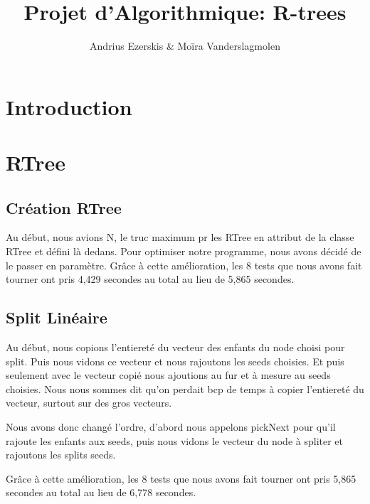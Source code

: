 \documentclass[utf8]{article}
\begin{document}
\begin{titlepage}


\author{Andrius Ezerskis \& Moïra Vanderslagmolen}
\title{Projet d'Algorithmique: R-trees}

\maketitle
\end{titlepage}
\tableofcontents
\newpage
\begin{large}



\section{Introduction}
\indent
\par


\par
\section{RTree}
\subsection{Création RTree}
\par
\indent
Au début, nous avions N, le truc maximum pr les RTree en attribut de la classe RTree et défini là dedans.
Pour optimiser notre programme, nous avons décidé de le passer en paramètre.
Grâce à cette amélioration, les 8 tests que nous avons fait tourner ont pris
4,429 secondes au total au lieu de 5,865 secondes.

\subsection{Split Linéaire}
\par
\indent
Au début, nous copions l'entiereté du vecteur des enfants du node choisi pour
split. Puis nous vidons ce vecteur et nous rajoutons les seeds choisies. Et puis
seulement avec le vecteur copié nous ajoutions au fur et à mesure au seeds
choisies. Nous nous sommes dit qu'on perdait bcp de temps à copier l'entiereté
du vecteur, surtout sur des gros vecteurs.

Nous avons donc changé l'ordre, d'abord nous appelons pickNext pour qu'il
rajoute les enfants aux seeds, puis nous vidons le vecteur du node à spliter et
rajoutons les splits seeds.

Grâce à cette amélioration, les 8 tests que nous avons fait tourner ont pris
5,865 secondes au total au lieu de 6,778 secondes.
\par

\end{large}
\end{document}
